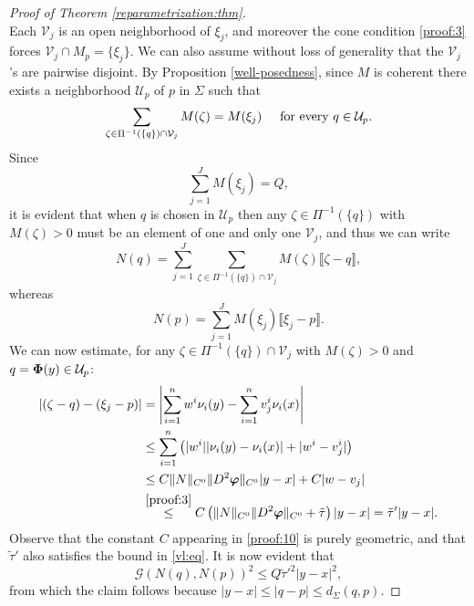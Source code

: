 \documentclass[a4paper,11pt,reqno]{amsart}
\theoremstyle{definition}
\numberwithin{equation}{section}
\numberwithin{subsection}{section}
\newcommand{\U}{\mathcal{U}}
\newcommand{\G}{\mathcal{G}}
\newcommand{\bphi}{\boldsymbol{\varphi}}
\begin{document}
\begin{proof}[Proof of Theorem \ref{reparametrization:thm}]
\begin{equation}
\end{equation}
Each $\mathcal{V}_{j}$ is an open neighborhood of $\xi_{j}$, and moreover the cone condition \eqref{proof:3} forces $\mathcal{V}_{j} \cap M_{p} = \{ \xi_{j} \}$. We can also assume without loss of generality that the $\mathcal{V}_{j}$'s are pairwise disjoint. By Proposition \ref{well-posedness}, since $M$ is coherent there exists a neighborhood $\U_{p}$ of $p$ in $\Sigma$ such that
\begin{equation} \label{proof:6}
\sum_{\zeta \in \Pi^{-1}(\{q\}) \cap \mathcal{V}_{j}} M(\zeta) = M(\xi_{j}) \hspace{0.5cm} \mbox{for every } q \in \U_{p}.
\end{equation}
Since 
\begin{equation} \label{proof:7}
\sum_{j=1}^{J} M(\xi_{j}) = Q,
\end{equation}
it is evident that when $q$ is chosen in $\U_{p}$ then any $\zeta \in \Pi^{-1}(\{q\})$ with $M(\zeta) > 0$ must be an element of one and only one $\mathcal{V}_{j}$, and thus we can write
\begin{equation} \label{proof:8}
N(q) = \sum_{j=1}^{J} \sum_{\zeta \in \Pi^{-1}(\{q\}) \cap \mathcal{V}_{j}} M(\zeta) \llbracket \zeta - q \rrbracket,
\end{equation}
whereas
\begin{equation} \label{proof:9}
N(p) = \sum_{j=1}^{J} M(\xi_{j}) \llbracket \xi_{j} - p \rrbracket.
\end{equation}
We can now estimate, for any $\zeta \in \Pi^{-1}(\{q\}) \cap \mathcal{V}_{j}$ with $M(\zeta) > 0$ and $q = {\bf \Phi}(y) \in \U_{p}$:
\begin{equation} \label{proof:10}
\begin{split}
\left| (\zeta - q) - (\xi_{j} - p) \right| &= \left| \sum_{i=1}^{n} w^{i} \nu_{i}(y) - \sum_{i=1}^{n} v_{j}^{i} \nu_{i}(x) \right| \\
&\leq \sum_{i=1}^{n} \left( |w^{i}| |\nu_{i}(y) - \nu_{i}(x)| + |w^{i} - v_{j}^{i}| \right) \\
&\leq C \| N \|_{C^{0}} \| D^{2}\bphi \|_{C^{0}} |y - x| + C |w - v_{j}| \\
&\overset{\eqref{proof:3}}{\leq} C \left( \| N \|_{C^{0}} \| D^{2}\bphi \|_{C^{0}} + \tilde{\tau} \right) |y - x| = \tilde{\tau}' |y - x|. 
\end{split}
\end{equation}
Observe that the constant $C$ appearing in \eqref{proof:10} is purely geometric, and that $\tilde{\tau}'$ also satisfies the bound in \eqref{vl:eq}. It is now evident that
\begin{equation} \label{proof:11}
\G(N(q), N(p))^{2} \leq Q \tilde{\tau}'^{2} |y - x|^{2},
\end{equation}
from which the claim follows because $|y - x| \leq |q - p| \leq d_{\Sigma}(q,p)$.


\end{proof}
\end{document}

